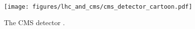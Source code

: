 \begin{figure}
\centering
\texttt{[image: figures/lhc\_and\_cms/cms\_detector\_cartoon.pdf]}
\caption{The CMS detector \cite{cms_detector_cartoon}.}
\label{cms_detector_cartoon}
\end{figure}